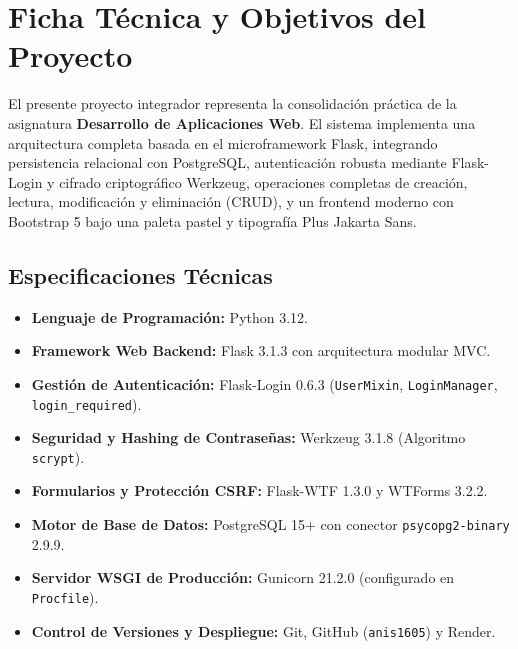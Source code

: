 \documentclass[11pt,a4paper]{article}
\begin{document}
\newpage
\tableofcontents
\newpage

\section{Ficha Técnica y Objetivos del Proyecto}

El presente proyecto integrador representa la consolidación práctica de la asignatura \textbf{Desarrollo de Aplicaciones Web}. El sistema implementa una arquitectura completa basada en el microframework Flask, integrando persistencia relacional con PostgreSQL, autenticación robusta mediante Flask-Login y cifrado criptográfico Werkzeug, operaciones completas de creación, lectura, modificación y eliminación (CRUD), y un frontend moderno con Bootstrap 5 bajo una paleta pastel y tipografía Plus Jakarta Sans.

\subsection{Especificaciones Técnicas}
\begin{itemize}[leftmargin=1.5cm]
    \item \textbf{Lenguaje de Programación:} Python 3.12.
    \item \textbf{Framework Web Backend:} Flask 3.1.3 con arquitectura modular MVC.
    \item \textbf{Gestión de Autenticación:} Flask-Login 0.6.3 (\texttt{UserMixin}, \texttt{LoginManager}, \texttt{login\_required}).
    \item \textbf{Seguridad y Hashing de Contraseñas:} Werkzeug 3.1.8 (Algoritmo \texttt{scrypt}).
    \item \textbf{Formularios y Protección CSRF:} Flask-WTF 1.3.0 y WTForms 3.2.2.
    \item \textbf{Motor de Base de Datos:} PostgreSQL 15+ con conector \texttt{psycopg2-binary} 2.9.9.
    \item \textbf{Servidor WSGI de Producción:} Gunicorn 21.2.0 (configurado en \texttt{Procfile}).
    \item \textbf{Control de Versiones y Despliegue:} Git, GitHub (\texttt{anis1605}) y Render.
\end{itemize}
\end{document}
